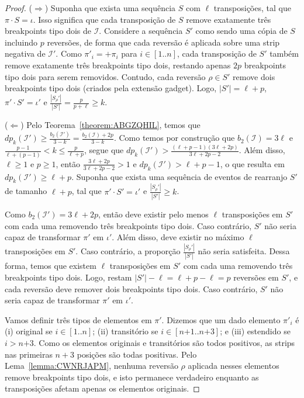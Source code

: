 \begin{proof}
($\Rightarrow$) Suponha que exista uma sequência $S$ com $\ell$ transposições, tal que $\pi \cdot S = \iota$. Isso significa que cada transposição de $S$ remove exatamente três breakpoints tipo dois de $\mathcal{I}$. Considere a sequência $S'$ como sendo uma cópia de $S$ incluindo $p$ reversões, de forma que cada reversão é aplicada sobre uma strip negativa de $\mathcal{I'}$. Como $\pi'_i = +\pi_i$ para $i \in [1..n]$, cada transposição de $S'$ também remove exatamente três breakpoints tipo dois, restando apenas $2p$ breakpoints tipo dois para serem removidos. Contudo, cada reversão $\rho \in S'$ remove dois breakpoints tipo dois (criados pela extensão gadget). Logo, $|S'| = \ell+p$, $\pi' \cdot S' = \iota'$ e $\frac{|S_{\rho}'|}{|S'|} = \frac{p}{p+\ell} \ge k$.

($\Leftarrow$) Pelo Teorema~\ref{theorem:ABGZQHIL}, temos que $dp_k(\mathcal{I'}) \ge \frac{b_2(\mathcal{I'})}{3-k} = \frac{b_2(\mathcal{I})+2p}{3-k}$. Como temos por construção que $b_2(\mathcal{I}) = 3\ell$ e $\frac{p-1}{\ell+(p-1)} < k \leq \frac{p}{\ell+p}$, segue que $dp_k(\mathcal{I'}) > \frac{(\ell+p-1)(3\ell+2p)}{3\ell+2p-2}$. Além disso, $\ell \geq 1$ e $p \geq 1$, então $\frac{3\ell+2p}{3\ell+2p-2} > 1$ e $dp_k(\mathcal{I'}) > \ell+p-1$, o que resulta em $dp_k(\mathcal{I'}) \ge \ell + p$. Suponha que exista uma sequência de eventos de rearranjo $S'$ de tamanho $\ell + p$, tal que $\pi' \cdot S' = \iota'$ e $\frac{|S_{\rho}'|}{|S'|} \ge k$.

Como $b_2(\mathcal{I'}) = 3\ell+2p$, então deve existir pelo menos $\ell$ transposições em $S'$ com cada uma removendo três breakpoints tipo dois. Caso contrário, $S'$ não seria capaz de transformar $\pi'$ em $\iota'$. Além disso, deve existir no máximo $\ell$ transposições em $S'$. Caso contrário, a proporção $\frac{|S_{\rho}'|}{|S'|}$ não seria satisfeita. Dessa forma, temos que existem $\ell$ transposições em $S'$ com cada uma removendo três breakpoints tipo dois. Logo, restam $|S'| - \ell = \ell+p - \ell = p$ reversões em $S'$, e cada reversão deve remover dois breakpoints tipo dois. Caso contrário, $S'$ não seria capaz de transformar $\pi'$ em $\iota'$.

Vamos definir três tipos de elementos em $\pi'$. Dizemos que um dado elemento $\pi'_i$ é (i) original se $i \in [1..n]$; (ii) transitório se $i \in [n{+1}..n{+3}]$; e (iii) estendido se $i > n{+3}$. Como os elementos originais e transitórios são todos positivos, as strips nas primeiras $n+3$ posições são todas positivas. Pelo Lema~\ref{lemma:CWNRJAPM}, nenhuma reversão $\rho$ aplicada nesses elementos remove breakpoints tipo dois, e isto permanece verdadeiro enquanto as transposições afetam apenas os elementos originais.


\end{proof}
